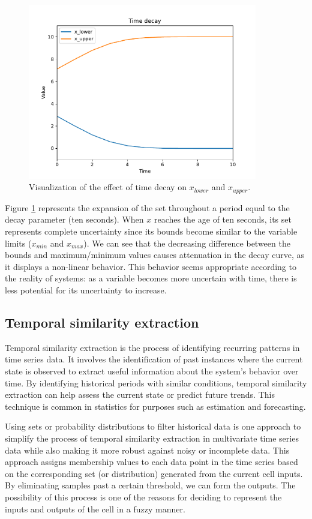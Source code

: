 \begin{figure}[h!]
    \centering
    \includegraphics[width=10cm]{figures/chapter4/cell/time_decay.pdf}
    \caption{Visualization of the effect of time decay on $x_{lower}$ and $x_{upper}$.}
    \label{fig:timedecay}
\end{figure}

Figure \ref{fig:timedecay} represents the expansion of the set throughout a period equal to the decay parameter (ten seconds). When $x$ reaches the age of ten seconds, its set represents complete uncertainty since its bounds become similar to the variable limits ($x_{min}$ and $x_{max}$). We can see that the decreasing difference between the bounds and maximum/minimum values causes attenuation in the decay curve, as it displays a non-linear behavior. This behavior seems appropriate according to the reality of systems: as a variable becomes more uncertain with time, there is less potential for its uncertainty to increase.


\subsection{Temporal similarity extraction} \label{subsec:tempsim}

Temporal similarity extraction is the process of identifying recurring patterns in time series data. It involves the identification of past instances where the current state is observed to extract useful information about the system's behavior over time. By identifying historical periods with similar conditions, temporal similarity extraction can help assess the current state or predict future trends. This technique is common in statistics for purposes such as estimation and forecasting.

Using sets or probability distributions to filter historical data is one approach to simplify the process of temporal similarity extraction in multivariate time series data while also making it more robust against noisy or incomplete data. This approach assigns membership values to each data point in the time series based on the corresponding set (or distribution) generated from the current cell inputs. By eliminating samples past a certain threshold, we can form the outputs. The possibility of this process is one of the reasons for deciding to represent the inputs and outputs of the cell in a fuzzy manner. 

